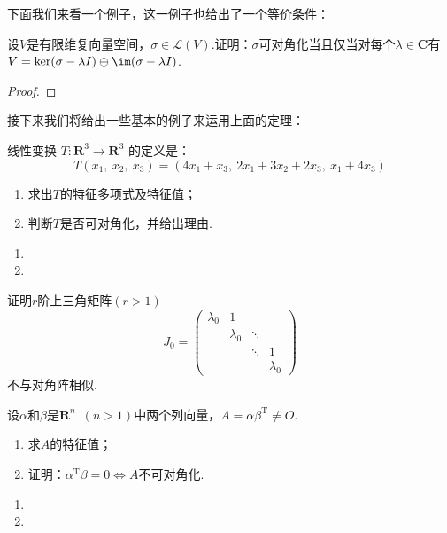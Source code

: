下面我们来看一个例子，这一例子也给出了一个等价条件：
\begin{example}
    设$V$是有限维复向量空间，$\sigma\in \mathcal{L}(V)$.证明：$\sigma$可对角化当且仅当对每个$\lambda\in\mathbf{C}$有
	$V=\ker(\sigma-\lambda I)\oplus\im(\sigma-\lambda I)$.
\end{example}
\begin{proof}
    
\end{proof}

接下来我们将给出一些基本的例子来运用上面的定理：
\begin{example}
    线性变换 $T : \mathbf{R}^3 \to \mathbf{R}^3$ 的定义是：
    \[T(x_1,\ x_2,\ x_3)=(4x_1+x_3,\ 2x_1+3x_2+2x_3,\ x_1+4x_3)\]
    \begin{enumerate}[label=(\arabic*)]
        \item 求出$T$的特征多项式及特征值；
        \item 判断$T$是否可对角化，并给出理由.
    \end{enumerate}
\end{example}
\begin{solution}
    \begin{enumerate}[label=(\arabic*)]
        \item 
        \item 
    \end{enumerate}
\end{solution}

\begin{example}
    证明$r$阶上三角矩阵$(r>1)$
    \[J_0=\begin{pmatrix}
        \lambda_0 & 1 &  &  \\
          & \lambda_0 & \ddots &  \\
          &  & \ddots &  1 \\
          &  &  &  \lambda_0
    \end{pmatrix}\]
    不与对角阵相似.
\end{example}
\begin{solution}

\end{solution}

\begin{example}
    设$\alpha$和$\beta$是$\mathbf{R}^n\enspace (n>1)$中两个列向量，$A=\alpha\beta^\mathrm{T}\neq O$.
    \begin{enumerate}[label=(\arabic*)]
        \item 求$A$的特征值；

        \item 证明：$\alpha^\mathrm{T}\beta=0\iff A$不可对角化.
    \end{enumerate}
\end{example}
\begin{solution}
    \begin{enumerate}[label=(\arabic*)]
        \item 
        \item 
    \end{enumerate}
\end{solution}

